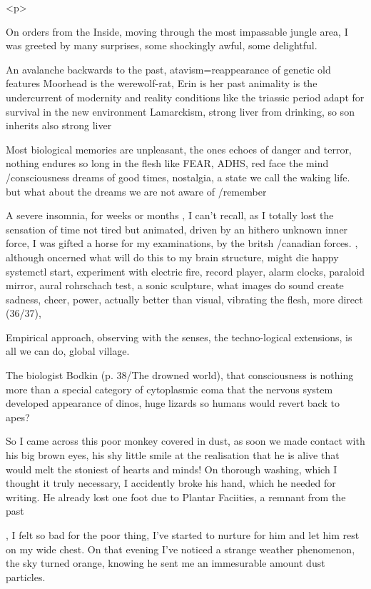 \documentclass{article}
\begin{document}
<p>


On orders from the Inside, 
moving through the most impassable jungle area,
I was greeted by many surprises, some shockingly awful, some delightful.

An avalanche backwards to the past,
atavism=reappearance of genetic old features
Moorhead is the werewolf-rat, Erin is her past
animality is the undercurrent of modernity and reality
conditions like the triassic period
adapt for survival in the new environment
Lamarckism, strong liver from drinking, so son inherits also strong liver

Most biological memories are unpleasant, the ones echoes of danger and
terror, nothing endures so long in the flesh like FEAR, 
ADHS, red face
the mind /consciousness dreams of good times, nostalgia, a state
we call the waking life.
but what about the dreams we are not aware of /remember


A severe insomnia, for weeks or months , I can't recall, 
as I totally lost the sensation of time
not tired but animated, driven by an hithero unknown inner force, 
I was gifted a horse for my examinations, 
by the britsh /canadian forces.  
, although oncerned what will do this to my brain structure, 
might die happy
systemctl start, 
experiment with electric fire, record player, alarm clocks, paraloid mirror,
aural rohrschach test, a sonic sculpture, what images do sound create
sadness, cheer, power,
actually better than visual, vibrating the flesh, more direct
(36/37), 


Empirical approach, observing with the senses, 
the techno-logical extensions, is all we can do, global village.

The biologist Bodkin (p. 38/The drowned world), that consciousness is nothing more than a special category of cytoplasmic coma that the nervous system developed
appearance of dinos, huge lizards so humans would revert back to apes?





So I came across this poor monkey covered in dust, 
as soon we made contact with his big brown eyes, his shy little smile at the realisation that he is alive 
that would melt the stoniest of hearts and minds!
On thorough washing, which I thought it truly necessary, I accidently broke his hand, which he needed for writing. He already lost one foot due to Plantar Faciities,
a remnant from the past

,
I felt so bad for the poor thing, I've started to nurture for him and let him rest on my wide chest. On that evening I've noticed a strange weather phenomenon, the sky turned orange, knowing he sent me an immesurable amount dust particles. 
\end{document}
